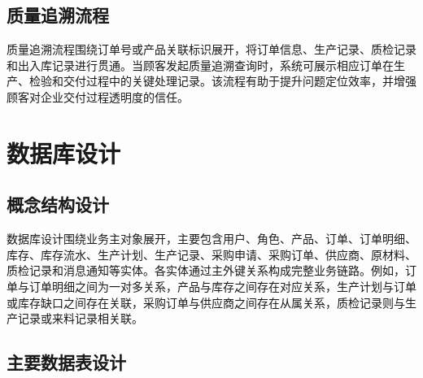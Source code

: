 \subsection{质量追溯流程}

质量追溯流程围绕订单号或产品关联标识展开，将订单信息、生产记录、质检记录和出入库记录进行贯通。当顾客发起质量追溯查询时，系统可展示相应订单在生产、检验和交付过程中的关键处理记录。该流程有助于提升问题定位效率，并增强顾客对企业交付过程透明度的信任。

\section{数据库设计}

\subsection{概念结构设计}

数据库设计围绕业务主对象展开，主要包含用户、角色、产品、订单、订单明细、库存、库存流水、生产计划、生产记录、采购申请、采购订单、供应商、原材料、质检记录和消息通知等实体。各实体通过主外键关系构成完整业务链路。例如，订单与订单明细之间为一对多关系，产品与库存之间存在对应关系，生产计划与订单或库存缺口之间存在关联，采购订单与供应商之间存在从属关系，质检记录则与生产记录或来料记录相关联。

\subsection{主要数据表设计}

